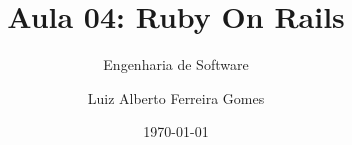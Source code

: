\author{Luiz Alberto Ferreira Gomes}
\title{Aula 04: Ruby On Rails}
\subtitle{Engenharia de Software}
\date{\today}
